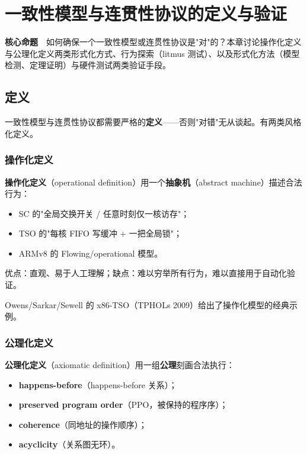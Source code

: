 \chapter{一致性模型与连贯性协议的定义与验证}

\begin{epigraph}
\textbf{核心命题}　如何确保一个一致性模型或连贯性协议是"对"的？本章讨论操作化定义与公理化定义两类形式化方式、行为探索（litmus 测试）、以及形式化方法（模型检测、定理证明）与硬件测试两类验证手段。
\end{epigraph}



\section{定义}

一致性模型与连贯性协议都需要严格的\textbf{定义}——否则"对错"无从谈起。有两类风格化定义。

\subsection{操作化定义}

\textbf{操作化定义}（operational definition）用一个\textbf{抽象机}（abstract machine）描述合法行为：

\begin{itemize}
\item SC 的"全局交换开关 / 任意时刻仅一核访存"；
\item TSO 的"每核 FIFO 写缓冲 + 一把全局锁"；
\item ARMv8 的 Flowing/operational 模型。
\end{itemize}


优点：直观、易于人工理解；缺点：难以穷举所有行为，难以直接用于自动化验证。

Owens/Sarkar/Sewell 的 x86-TSO（TPHOLs 2009）给出了操作化模型的经典示例。

\subsection{公理化定义}

\textbf{公理化定义}（axiomatic definition）用一组\textbf{公理}刻画合法执行：

\begin{itemize}
\item \textbf{happens-before}（happens-before 关系）；
\item \textbf{preserved program order}（PPO，被保持的程序序）；
\item \textbf{coherence}（同地址的操作顺序）；
\item \textbf{acyclicity}（关系图无环）。
\end{itemize}


